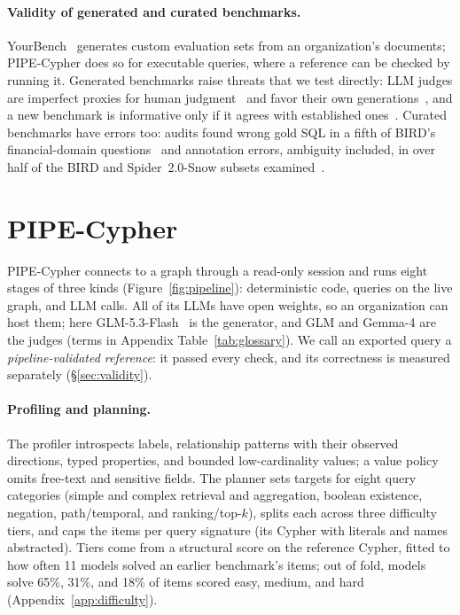 \documentclass[11pt]{article}
\begin{document}
\paragraph{Validity of generated and curated benchmarks.} YourBench~\citep{yourbench2025} generates custom evaluation sets from an organization's documents; PIPE-Cypher does so for executable queries, where a reference can be checked by running it. Generated benchmarks raise threats that we test directly: LLM judges are imperfect proxies for human judgment~\citep{zheng2023judging} and favor their own generations~\citep{panickssery2024selfpref}, and a new benchmark is informative only if it agrees with established ones~\citep{perlitz2024agreement}. Curated benchmarks have errors too: audits found wrong gold SQL in a fifth of BIRD's financial-domain questions~\citep{wretblad2024noise} and annotation errors, ambiguity included, in over half of the BIRD and Spider~2.0-Snow subsets examined~\citep{jin2026pervasive}.

\section{PIPE-Cypher}
\label{sec:method}
PIPE-Cypher connects to a graph through a read-only session and runs eight stages of three kinds (Figure~\ref{fig:pipeline}): deterministic code, queries on the live graph, and LLM calls. All of its LLMs have open weights, so an organization can host them; here GLM-5.3-Flash~\citep{glm53flash2026hf} is the generator, and GLM and Gemma-4 are the judges (terms in Appendix Table~\ref{tab:glossary}). We call an exported query a \emph{pipeline-validated reference}: it passed every check, and its correctness is measured separately (\S\ref{sec:validity}).

\paragraph{Profiling and planning.} The profiler introspects labels, relationship patterns with their observed directions, typed properties, and bounded low-cardinality values; a value policy omits free-text and sensitive fields. The planner sets targets for eight query categories (simple and complex retrieval and aggregation, boolean existence, negation, path/temporal, and ranking/top-$k$), splits each across three difficulty tiers, and caps the items per query signature (its Cypher with literals and names abstracted). Tiers come from a structural score on the reference Cypher, fitted to how often 11 models solved an earlier benchmark's items; out of fold, models solve 65\%, 31\%, and 18\% of items scored easy, medium, and hard (Appendix~\ref{app:difficulty}).
\end{document}

